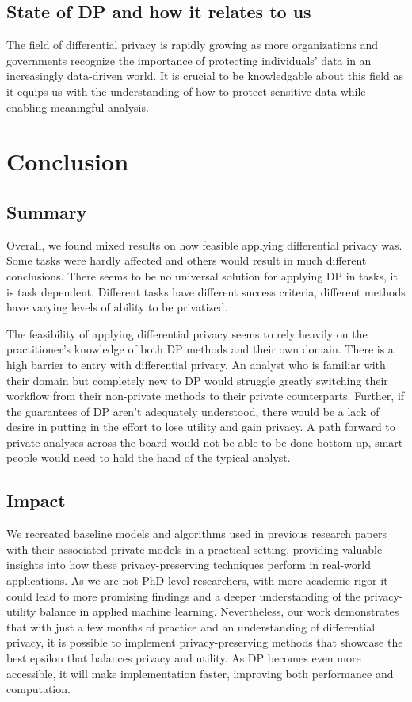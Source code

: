\documentclass[12pt,letterpaper]{article}
\begin{document}
{\subsection{State of DP and how it relates to us}
The field of differential privacy is rapidly growing as more organizations and governments recognize the importance of protecting individuals' data in an increasingly data-driven world. It is crucial to be knowledgable about this field as it equips us with the understanding of how to protect sensitive data while enabling meaningful analysis.


\section{Conclusion}


\subsection{Summary}
Overall, we found mixed results on how feasible applying differential privacy was. Some tasks were hardly affected and others would result in much different conclusions. There seems to be no universal solution for applying DP in tasks, it is task dependent. Different tasks have different success criteria, different methods have varying levels of ability to be privatized.

The feasibility of applying differential privacy seems to rely heavily on the practitioner's knowledge of both DP methods and their own domain. There is a high barrier to entry with differential privacy. An analyst who is familiar with their domain but completely new to DP would struggle greatly switching their workflow from their non-private methods to their private counterparts. Further, if the guarantees of DP aren't adequately understood, there would be a lack of desire in putting in the effort to lose utility and gain privacy. A path forward to private analyses across the board would not be able to be done bottom up, smart people would need to hold the hand of the typical analyst.

\subsection{Impact}
We recreated baseline models and algorithms used in previous research papers with their associated private models in a practical setting, providing valuable insights into how these privacy-preserving techniques perform in real-world applications. As we are not PhD-level researchers, with more academic rigor it could lead to more promising findings and a deeper understanding of the privacy-utility balance in applied machine learning. Nevertheless, our work demonstrates that with just a few months of practice and an understanding of differential privacy, it is possible to implement privacy-preserving methods that showcase the best epsilon that balances privacy and utility. As DP becomes even more accessible, it will make implementation faster, improving both performance and computation.

}
\end{document}

